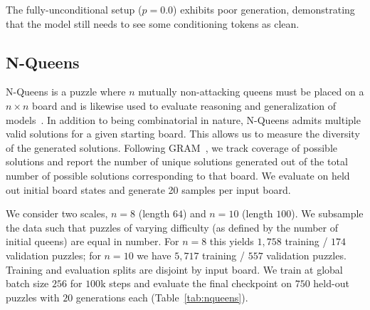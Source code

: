 \documentclass{article}
\begin{document}
The fully-unconditional setup ($p=0.0$) exhibits poor generation, demonstrating that the model still needs to see
some conditioning tokens as clean.


\subsection{N-Queens}
\label{sec:nqueens}

N-Queens is a puzzle where $n$ mutually non-attacking queens must be placed on a 
$n\times n$ board and is
likewise used to evaluate reasoning and generalization of models~\citep{gram}. In addition to being 
combinatorial in nature,
N-Queens admits multiple valid solutions for a given starting board. This allows us to measure the
diversity of the generated solutions. Following GRAM~\citep{gram}, we track coverage of possible
solutions and report the number of unique solutions generated out of the total number of possible solutions corresponding to
that board. We evaluate on held out initial board states and generate 20 samples per input
board. 

We consider two scales, $n=8$ (length $64$) and $n=10$ (length $100$). We subsample the data
such that puzzles of varying difficulty (as defined by the number of initial queens) are equal
in number. For $n=8$ this yields $1{,}758$ training / $174$ validation puzzles; for
$n=10$ we have $5{,}717$ training / $557$ validation puzzles. Training and evaluation splits are
disjoint by input board. We train at global batch size $256$ for $100$k
steps and evaluate the final checkpoint on $750$ held-out puzzles with $20$ generations each
(Table~\ref{tab:nqueens}).
\end{document}
